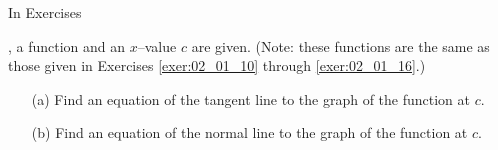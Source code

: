 {\noindent In Exercises}
{, a function and an $x$--value $c$ are given. (Note: these functions are the same as those given in Exercises \ref{exer:02_01_10} through \ref{exer:02_01_16}.)
\begin{enumerate}
\item	[(a)] Find an equation of the tangent line to the graph of the function at $c$.
\item	[(b)] Find an equation of the normal line to the graph of the function at $c$.
\end{enumerate}
}
